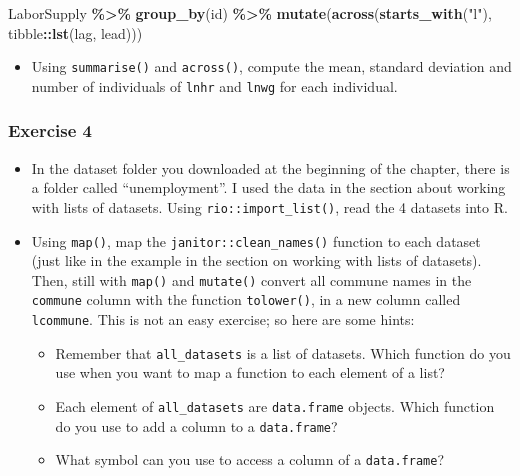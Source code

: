 \documentclass[
]{article}
\newenvironment{Shaded}{\begin{snugshade}}{\end{snugshade}}
\newcommand{\KeywordTok}[1]{\textcolor[rgb]{0.13,0.29,0.53}{\textbf{#1}}}
\newcommand{\NormalTok}[1]{#1}
\newcommand{\OperatorTok}[1]{\textcolor[rgb]{0.81,0.36,0.00}{\textbf{#1}}}
\newcommand{\StringTok}[1]{\textcolor[rgb]{0.31,0.60,0.02}{#1}}
\providecommand{\tightlist}{%
  \setlength{\itemsep}{0pt}\setlength{\parskip}{0pt}}
\begin{document}
\begin{Shaded}
\begin{Highlighting}[]
\NormalTok{LaborSupply }\OperatorTok{\%\textgreater{}\%}
\StringTok{  }\KeywordTok{group\_by}\NormalTok{(id) }\OperatorTok{\%\textgreater{}\%}
\StringTok{  }\KeywordTok{mutate}\NormalTok{(}\KeywordTok{across}\NormalTok{(}\KeywordTok{starts\_with}\NormalTok{(}\StringTok{"l"}\NormalTok{), tibble}\OperatorTok{::}\KeywordTok{lst}\NormalTok{(lag, lead)))}
\end{Highlighting}
\end{Shaded}

\begin{itemize}
\tightlist
\item
  Using \texttt{summarise()} and \texttt{across()}, compute the mean, standard deviation and number of individuals of \texttt{lnhr} and \texttt{lnwg} for each individual.
\end{itemize}

\hypertarget{exercise-4-1}{%
\subsubsection*{Exercise 4}\label{exercise-4-1}}

\begin{itemize}
\item
  In the dataset folder you downloaded at the beginning of the chapter, there is a folder called
  ``unemployment''. I used the data in the section about working with lists of datasets. Using
  \texttt{rio::import\_list()}, read the 4 datasets into R.
\item
  Using \texttt{map()}, map the \texttt{janitor::clean\_names()} function to each dataset (just like in the example
  in the section on working with lists of datasets). Then, still with \texttt{map()} and \texttt{mutate()} convert
  all commune names in the \texttt{commune} column with the function \texttt{tolower()}, in a new column called \texttt{lcommune}.
  This is not an easy exercise; so here are some hints:

  \begin{itemize}
  \tightlist
  \item
    Remember that \texttt{all\_datasets} is a list of datasets. Which function do you use when you want to map a function to each element of a list?
  \item
    Each element of \texttt{all\_datasets} are \texttt{data.frame} objects. Which function do you use to add a column to a \texttt{data.frame}?
  \item
    What symbol can you use to access a column of a \texttt{data.frame}?
  \end{itemize}
\end{itemize}
\end{document}
